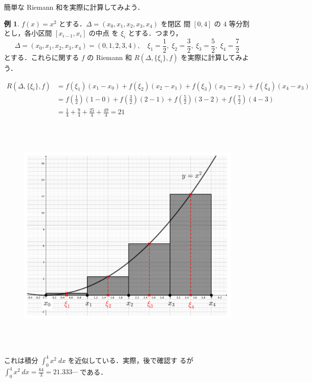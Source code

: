 \documentclass[10pt, uplatex, dvipdfmx]{jsarticle}
\theoremstyle{definition}
\newtheorem{example}[theorem]{例}
\numberwithin{equation}{section}
\newcommand{\ds}{\displaystyle}
\begin{document}
\newpage

簡単な Riemann 和を実際に計算してみよう．

\begin{example}
  $f(x)=x^2$ とする．$\Delta=(x_0,x_1,x_2,x_3,x_4)$ を閉区
  間 $[0,4]$ の $4$ 等分割とし，各小区間 $[ x_{i-1}, x_{i}]$ の中点
  を $\xi_i$ とする．つまり，
  \[
    \Delta=(x_0, x_1, x_2, x_3, x_4) =(0,1,2,3,4), \quad
    \xi_1=\frac{1}{2}, \; \xi_2=\frac{3}{2}, \; \xi_3=\frac{5}{2}, \;
    \xi_4 = \frac{7}{2}
  \]
  とする．これらに関する $f$ の Riemann 和 $R(\Delta, \{\xi_i\}, f)$ を実際に計算してみよう．
  \vspace{-2.5zh}
  \begin{spacing}{2}
  \[
    \begin{aligned}
      R\left( \Delta, \{\xi_i\}, f\right)
      &=f(\xi_1)(x_1-x_0)+f(\xi_2)(x_2-x_1) + f(\xi_3)(x_3-x_2) +
        f(\xi_4)(x_4-x_3)\\
      &= f\left(\frac{1}{2}\right) \left( 1-0 \right) + f\left(\frac{3}{2}\right)\left(2-1\right)
        + f\left(\frac{5}{2}\right) \left(3-2\right) + f\left(\frac{7}{2}\right)\left(4-3\right)\\
      & = \frac{1}{4} + \frac{9}{4} + \frac{25}{4} + \frac{49}{4} = 21
    \end{aligned}
  \]
\end{spacing}
\vspace{-3zh}
\begin{figure}[h]
  \centering
  \includegraphics[height=12cm]{./pictures/02/parabola.pdf}
\end{figure}

これは積分 $\ds \int_{0}^{4}x^2 \ dx $ を近似している．実際，後で確認す
るが $\ds \int_{0}^{4} x^2 \ dx = \frac{64}{3} = 21.333\cdots$ である．
\end{example}
\end{document}
